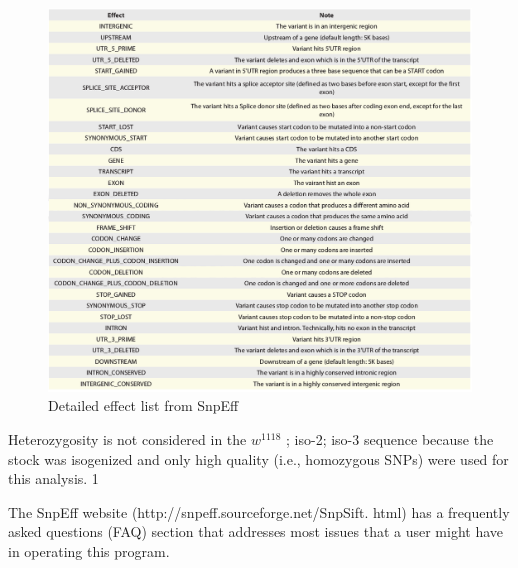 \begin{figure}
    \centering
    \includegraphics[width=14cm]{snpeff_table2.png}
    \caption{Detailed effect list from SnpEff}
    \label{fig:snpeffTab2}
\end{figure}

Heterozygosity is not considered in the $w^{1118}$ ; iso-2; iso-3 sequence because the stock was isogenized and only high quality (i.e., homozygous SNPs) were used for this analysis. 1 

The SnpEff website (http://snpeff.sourceforge.net/SnpSift.  html) has a frequently asked questions (FAQ) section that addresses most issues that a user might have in operating this program.

